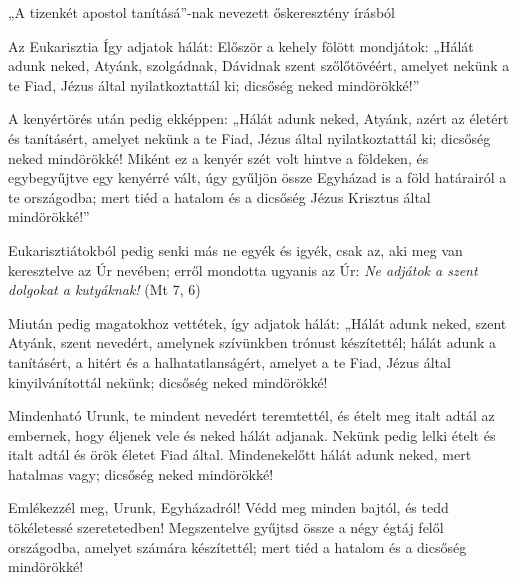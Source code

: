 \documentclass[twoside]{article}
\begin{document}


„A tizenkét apostol tanításá”-nak nevezett őskeresztény írásból

{\centering{}}

\begin{lectio}{Az Eukarisztia}
\noindent Így adjatok hálát: Először a kehely fölött mondjátok: „Hálát adunk neked, Atyánk, szolgádnak, Dávidnak szent szőlőtövéért, amelyet nekünk a te Fiad, Jézus által nyilatkoztattál ki; dicsőség neked mindörökké!”

A kenyértörés után pedig ekképpen: „Hálát adunk neked, Atyánk, azért az életért és tanításért, amelyet nekünk a te Fiad, Jézus által nyilatkoztattál ki; dicsőség neked mindörökké! Miként ez a kenyér szét volt hintve a földeken, és egybegyűjtve egy kenyérré vált, úgy gyűljön össze Egyházad is a föld határairól a te országodba; mert tiéd a hatalom és a dicsőség Jézus Krisztus által mindörökké!”

Eukarisztiátokból pedig senki más ne egyék és igyék, csak az, aki meg van keresztelve az Úr nevében; erről mondotta ugyanis az Úr: \textit{Ne adjátok a szent dolgokat a kutyáknak!} (Mt 7, 6)

Miután pedig magatokhoz vettétek, így adjatok hálát: „Hálát adunk neked, szent Atyánk, szent nevedért, amelynek szívünkben trónust készítettél; hálát adunk a tanításért, a hitért és a halhatatlanságért, amelyet a te Fiad, Jézus által kinyilvánítottál nekünk; dicsőség neked mindörökké!

Mindenható Urunk, te mindent nevedért teremtettél, és ételt meg italt adtál az embernek, hogy éljenek vele és neked hálát adjanak. Nekünk pedig lelki ételt és italt adtál és örök életet Fiad által. Mindenekelőtt hálát adunk neked, mert hatalmas vagy; dicsőség neked mindörökké!

Emlékezzél meg, Urunk, Egyházadról! Védd meg minden bajtól, és tedd tökéletessé szeretetedben! Megszentelve gyűjtsd össze a négy égtáj felől országodba, amelyet számára készítettél; mert tiéd a hatalom és a dicsőség mindörökké!


\end{lectio}
\end{document}
